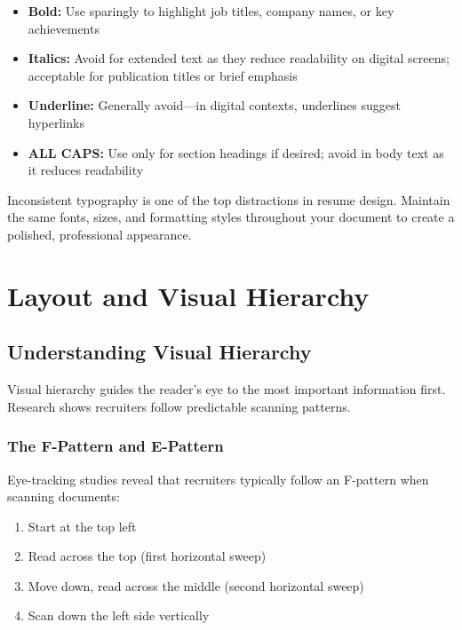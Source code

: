 \documentclass[11pt,a4paper]{article}
\begin{document}
\begin{itemize}
    \item \textbf{Bold:} Use sparingly to highlight job titles, company names, or key achievements
    \item \textbf{Italics:} Avoid for extended text as they reduce readability on digital screens; acceptable for publication titles or brief emphasis
    \item \textbf{Underline:} Generally avoid---in digital contexts, underlines suggest hyperlinks
    \item \textbf{ALL CAPS:} Use only for section headings if desired; avoid in body text as it reduces readability
\end{itemize}

\begin{warning}
Inconsistent typography is one of the top distractions in resume design. Maintain the same fonts, sizes, and formatting styles throughout your document to create a polished, professional appearance.
\end{warning}

\section{Layout and Visual Hierarchy}

\subsection{Understanding Visual Hierarchy}

Visual hierarchy guides the reader's eye to the most important information first. Research shows recruiters follow predictable scanning patterns.

\subsubsection{The F-Pattern and E-Pattern}

Eye-tracking studies reveal that recruiters typically follow an F-pattern when scanning documents:

\begin{enumerate}
    \item Start at the top left
    \item Read across the top (first horizontal sweep)
    \item Move down, read across the middle (second horizontal sweep)
    \item Scan down the left side vertically
\end{enumerate}
\end{document}
